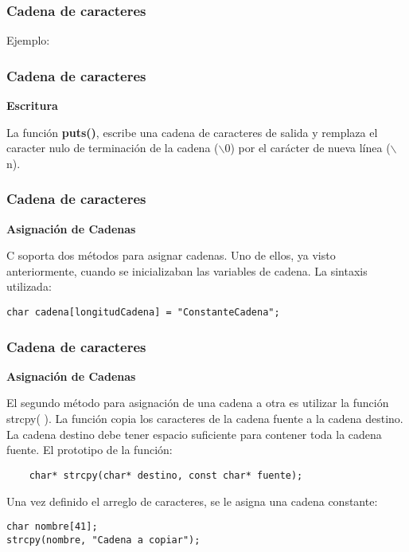 \begin{frame}
    \frametitle{Cadena de caracteres}
    \centering
    Ejemplo:
    
\end{frame}



\begin{frame}
    \frametitle{Cadena de caracteres}
    \begin{center}\textbf{Escritura}\end{center}
    La función \textbf{puts()}, escribe una cadena de caracteres de salida y remplaza el caracter nulo de terminación de la cadena ($\backslash$0) por el carácter de nueva línea ($\backslash$n).
\end{frame}



\begin{frame}[fragile]
    \frametitle{Cadena de caracteres}
    \begin{center}\textbf{Asignación de Cadenas}\end{center}
    \justify
    \hspace{5mm}C soporta dos métodos para asignar cadenas. Uno de ellos, ya visto anteriormente, cuando se inicializaban las variables de cadena. La sintaxis utilizada:
    \begin{lstlisting}
char cadena[longitudCadena] = "ConstanteCadena";
    \end{lstlisting}
\end{frame}


\begin{frame}[fragile]
    \frametitle{Cadena de caracteres}
    \begin{center}\textbf{Asignación de Cadenas}\end{center}
    \hspace{5mm}El segundo método para asignación de una cadena a otra es utilizar la función strcpy( ). La función copia los caracteres de la cadena fuente a la cadena destino. La cadena destino debe tener espacio suficiente para contener toda la cadena fuente. El prototipo de la función:
    \begin{lstlisting}
    char* strcpy(char* destino, const char* fuente);
    \end{lstlisting}
    Una vez definido el arreglo de caracteres, se le asigna una cadena constante:
    \begin{lstlisting}
char nombre[41];
strcpy(nombre, "Cadena a copiar");\end{lstlisting}
\end{frame}


